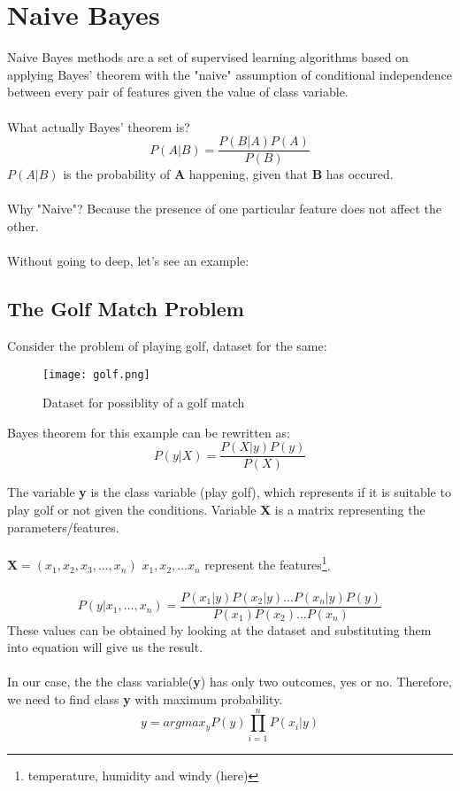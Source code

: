 \section*{Naive Bayes}

Naive Bayes methods are a set of supervised learning algorithms based on applying Bayes' theorem with the "naive" assumption of conditional independence between every pair of features given the value of class variable.\\ \\
What actually Bayes' theorem is?
\begin{equation}\label {eq:bayes}
	P(A|B) = \frac{P(B|A)P(A)}{P(B)}
\end{equation}
$P(A|B)$ is the probability of \textbf{A} happening, given that \textbf{B} has occured.\\ \\ Why "Naive"? Because the presence of one particular feature does not affect the other.
\\ \\ 
Without going to deep, let's see an example:

\subsection*{The Golf Match Problem}
	Consider the problem of playing golf, dataset for the same:
	\begin{figure}[h]
		\centering
		\texttt{[image: golf.png]}
		\caption{Dataset for possiblity of a golf match}
	\end{figure}

	Bayes theorem for this example can be rewritten as:
	\begin{equation}
		P(y|X) = \frac{P(X|y)P(y)}{P(X)}
	\end{equation}

	The variable \textbf{y} is the class variable (play golf), which represents if it is suitable to play golf or not given the conditions. Variable \textbf{X} is a matrix representing the parameters/features.
	\\ \\
	$\textbf{X} = (x_1, x_2, x_3, ... , x_n)$ \hfill	\small{$x_1, x_2, ... x_n$ represent the features}\footnote[1]{temperature, humidity and windy (here)}.
	\\ \\

	\begin{equation}
		P(y|x_1, ..., x_n) = \frac{P(x_1|y)P(x_2|y)...P(x_n|y)P(y)}{P(x_1)P(x_2)...P(x_n)}
	\end{equation}
	These values can be obtained by looking at the dataset and substituting them into equation will give us the result.
	\\ \\
	In our case, the the class variable(\textbf{y}) has only two outcomes, yes or no. Therefore, we need to find class \textbf{y} with maximum probability. 
	\begin{equation}
		y = argmax_yP(y)\prod_{i=1}^{n}P(x_i|y)
	\end{equation}

